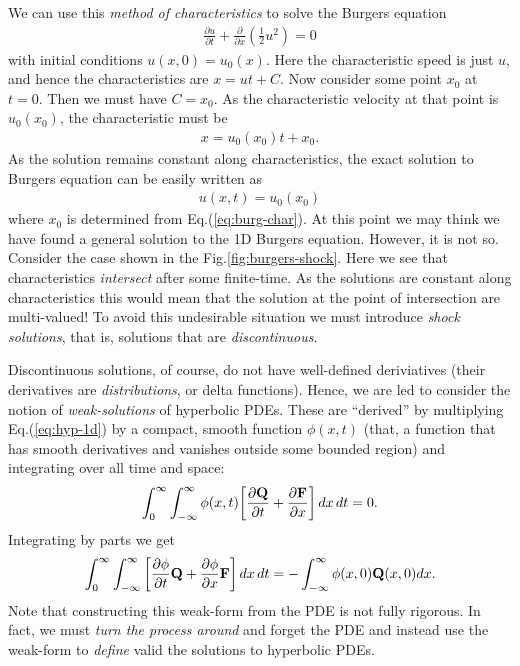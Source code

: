 \documentclass[12pt]{article}
\theoremstyle{definition}
\theoremstyle{definition}
\theoremstyle{definition}
\newcommand{\eqr}[1]{Eq.\thinspace(#1)}
\newcommand{\pfrac}[2]{\frac{\partial #1}{\partial #2}}
\newcommand{\pfraca}[1]{\frac{\partial}{\partial #1}}
\newcommand{\mvec}[1]{\mathbf{#1}}
\begin{document}
We can use this \emph{method of characteristics} to solve the Burgers
equation
\begin{align}
  \pfrac{u}{t} + \pfraca{x} \left(\frac{1}{2} u^2 \right) = 0
\end{align}
with initial conditions $u(x,0) = u_0(x)$. Here the characteristic
speed is just $u$, and hence the characteristics are $x = u t +
C$. Now consider some point $x_0$ at $t=0$. Then we must have
$C = x_0$. As the characteristic velocity at that point is $u_0(x_0)$,
the characteristic must be
\begin{align}
  x  = u_0(x_0) t + x_0.
  \label{eq:burg-char}
\end{align}
As the solution remains constant along characteristics, the exact
solution to Burgers equation can be easily written as
\begin{align}
  u(x,t) = u_0(x_0)
\end{align}
where $x_0$ is determined from \eqr{\ref{eq:burg-char}}. At this point
we may think we have found a general solution to the 1D Burgers
equation. However, it is not so. Consider the case shown in the
Fig.\thinspace\ref{fig:burgers-shock}. Here we see that
characteristics \emph{intersect} after some finite-time. As the
solutions are constant along characteristics this would mean that the
solution at the point of intersection are multi-valued! To avoid this
undesirable situation we must introduce \emph{shock solutions}, that
is, solutions that are \emph{discontinuous}. 

Discontinuous solutions, of course, do not have well-defined
deriviatives (their derivatives are \emph{distributions}, or delta
functions). Hence, we are led to consider the notion of
\emph{weak-solutions} of hyperbolic PDEs. These are ``derived'' by
multiplying \eqr{\ref{eq:hyp-1d}} by a compact, smooth function
$\phi(x,t)$ (that, a function that has smooth derivatives and vanishes
outside some bounded region) and integrating over all time and space:
\begin{align}
    \int_0^\infty  \int_{-\infty}^\infty \phi(x,t)
    \bigg[\pfrac{\mvec{Q}}{t} + \pfrac{\mvec{F}}{x}\bigg]\thinspace
    dx\thinspace dt = 0.
\end{align}
Integrating by parts we get
\begin{align}
    \int_0^\infty  \int_{-\infty}^\infty 
    \bigg[\pfrac{\phi}{t} \mvec{Q} + \pfrac{\phi}{x} \mvec{F}\bigg]\thinspace
    dx\thinspace dt
    =
    -
    \int_{-\infty}^\infty \phi(x,0) \mvec{Q}(x,0) dx.  
  \label{eq:hyp-weak-form}
\end{align}
Note that constructing this weak-form from the PDE is not fully
rigorous. In fact, we must \emph{turn the process around} and forget
the PDE and instead use the weak-form to \emph{define} valid the
solutions to hyperbolic PDEs.
\end{document}
